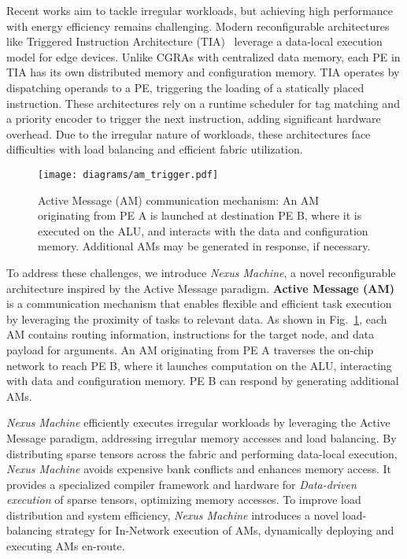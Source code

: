 Recent works aim to tackle irregular workloads, but achieving high performance with energy efficiency remains challenging. Modern reconfigurable architectures like Triggered Instruction Architecture (TIA)~\cite{tia} leverage a data-local execution model for edge devices. Unlike CGRAs with centralized data memory, each PE in TIA has its own distributed memory and configuration memory. TIA operates by dispatching operands to a PE, triggering the loading of a statically placed instruction. These architectures rely on a runtime scheduler for tag matching and a priority encoder to trigger the next instruction, adding significant hardware overhead. Due to the irregular nature of workloads, these architectures face difficulties with load balancing and efficient fabric utilization.

\begin{figure}[h!]
	\scriptsize
	\centering
    \texttt{[image: diagrams/am\_trigger.pdf]}
	\caption{Active Message (AM) communication mechanism: An AM originating from PE A is launched at destination PE B, where it is executed on the ALU, and interacts with the data and configuration memory. Additional AMs may be generated in response, if necessary.}
	\label{fig:active_message}
\end{figure}
To address these challenges, we introduce \textit{Nexus Machine}, a novel reconfigurable architecture inspired by the Active Message paradigm. \textbf{Active Message (AM)}~\cite{am_culler} is a communication mechanism that enables flexible and efficient task execution by leveraging the proximity of tasks to relevant data. As shown in Fig.~\ref{fig:active_message}, each AM contains routing information, instructions for the target node, and data payload for arguments. An AM originating from PE A traverses the on-chip network to reach PE B, where it launches computation on the ALU, interacting with data and configuration memory. PE B can respond by generating additional AMs.

\textit{Nexus Machine} efficiently executes irregular workloads by leveraging the Active Message paradigm, addressing irregular memory accesses and load balancing. By distributing sparse tensors across the fabric and performing data-local execution, \textit{Nexus Machine} avoids expensive bank conflicts and enhances memory access. It provides a specialized compiler framework and hardware for \textit{Data-driven execution} of sparse tensors, optimizing memory accesses. To improve load distribution and system efficiency, \textit{Nexus Machine} introduces a novel load-balancing strategy for In-Network execution of AMs, dynamically deploying and executing AMs en-route.

